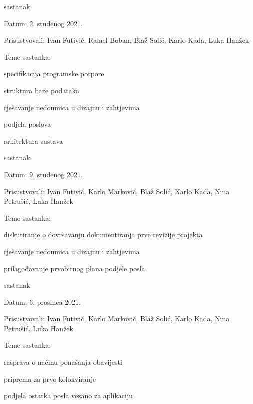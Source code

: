 \begin{packed_enum}
			\item  sastanak
			\item[] \begin{packed_item}
				\item Datum: 2. studenog 2021.
				\item Prisustvovali:  Ivan Futivić, Rafael Boban, Blaž Solić, Karlo Kada, Luka Hanžek
				\item Teme sastanka:
				\begin{packed_item}
					\item  specifikacija programske potpore
					\item  struktura baze podataka
					\item  rješavanje nedoumica u dizajnu i zahtjevima
					\item  podjela poslova
					\item  arhitektura sustava
				\end{packed_item}
			\end{packed_item}
			
			\item  sastanak
			\item[] \begin{packed_item}
				\item Datum: 9. studenog 2021.
				\item Prisustvovali:  Ivan Futivić, Karlo Marković, Blaž Solić, Karlo Kada, Nina Petrušić, Luka Hanžek
				\item Teme sastanka:
				\begin{packed_item}
					\item  diskutiranje o dovršavanju dokumentiranja prve revizije projekta
					\item  rješavanje nedoumica u dizajnu i zahtjevima
					\item  prilagođavanje prvobitnog plana podjele posla
				\end{packed_item}
			\end{packed_item}
			
			\item  sastanak
			\item[] \begin{packed_item}
				\item Datum: 6. prosinca 2021.
				\item Prisustvovali:  Ivan Futivić, Karlo Marković, Blaž Solić, Karlo Kada, Nina Petrušić, Luka Hanžek
				\item Teme sastanka:
				\begin{packed_item}
					\item  rasprava o načinu ponašanja obavijesti
					\item  priprema za prvo kolokviranje
					\item  podjela ostatka posla vezano za aplikaciju
				\end{packed_item}
			\end{packed_item}


\end{packed_enum}
